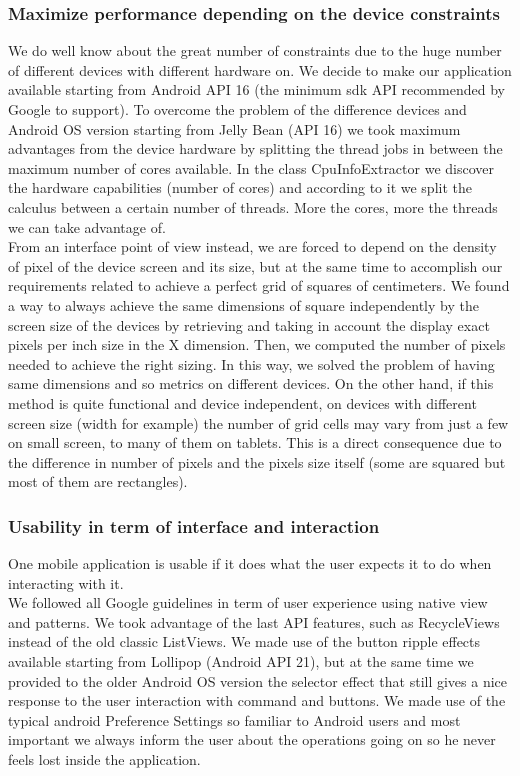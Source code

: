 \subsubsection{Maximize performance depending on the device constraints}
We do well know about the great number of constraints due to the huge number of different devices with different hardware on. We decide to make our application available starting from Android API 16 (the minimum sdk API recommended by Google to support).  To overcome the problem of the difference devices and Android OS version starting from Jelly Bean (API 16) we took maximum advantages from the device hardware by splitting the thread jobs in between the maximum number of cores available. In the class CpuInfoExtractor we discover the hardware capabilities (number of cores) and according to it we split the calculus between a certain number of threads. More the cores, more the threads we can take advantage of.\\
From an interface point of view instead, we are forced  to depend on the density of pixel of the device screen and its size, but at the same time to accomplish our requirements related to achieve a perfect grid of squares of centimeters. We found a way to always achieve the same dimensions of square independently by the screen size of the devices by retrieving and taking in account the display exact pixels per inch size in the X dimension. Then, we computed the number of pixels needed to achieve the right sizing.  In this way, we solved the problem of having same dimensions and so metrics on different devices. On the other hand, if this method is quite functional and device independent, on devices with different screen size (width for example) the number of grid cells may vary from just a few on small screen, to many of them on tablets. This is a direct consequence due to the difference in number of pixels and the pixels size itself (some are squared but most of them are rectangles).\\

\subsubsection{ Usability in term of interface and interaction}
One mobile application is usable if it does what the user expects it to do when interacting with it.\\
We followed all Google guidelines in term of user experience using native view and patterns. We took advantage of the last API features, such as RecycleViews instead of the old classic ListViews. We made use of the button ripple effects available starting from Lollipop (Android API 21), but at the same time we provided to the older Android OS version the selector effect that still gives a nice response to the user interaction with command and buttons. We made use of the typical android Preference Settings so familiar to Android users and most important we always inform the user about the operations going on so he never feels lost inside the application.